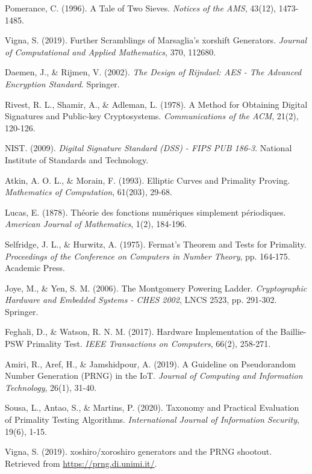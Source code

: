 \begin{thebibliography}{99}
 Pomerance, C. (1996). A Tale of Two Sieves. \textit{Notices of the AMS}, 43(12), 1473-1485.

 Vigna, S. (2019). Further Scramblings of Marsaglia's xorshift Generators. \textit{Journal of Computational and Applied Mathematics}, 370, 112680.

 Daemen, J., \& Rijmen, V. (2002). \textit{The Design of Rijndael: AES - The Advanced Encryption Standard}. Springer.

 Rivest, R. L., Shamir, A., \& Adleman, L. (1978). A Method for Obtaining Digital Signatures and Public-key Cryptosystems. \textit{Communications of the ACM}, 21(2), 120-126.

 NIST. (2009). \textit{Digital Signature Standard (DSS) - FIPS PUB 186-3}. National Institute of Standards and Technology.

 Atkin, A. O. L., \& Morain, F. (1993). Elliptic Curves and Primality Proving. \textit{Mathematics of Computation}, 61(203), 29-68.

 Lucas, E. (1878). Théorie des fonctions numériques simplement périodiques. \textit{American Journal of Mathematics}, 1(2), 184-196.

 Selfridge, J. L., \& Hurwitz, A. (1975). Fermat's Theorem and Tests for Primality. \textit{Proceedings of the Conference on Computers in Number Theory}, pp. 164-175. Academic Press.

 Joye, M., \& Yen, S. M. (2006). The Montgomery Powering Ladder. \textit{Cryptographic Hardware and Embedded Systems - CHES 2002}, LNCS 2523, pp. 291-302. Springer.

 Feghali, D., \& Watson, R. N. M. (2017). Hardware Implementation of the Baillie-PSW Primality Test. \textit{IEEE Transactions on Computers}, 66(2), 258-271.

 Amiri, R., Aref, H., \& Jamshidpour, A. (2019). A Guideline on Pseudorandom Number Generation (PRNG) in the IoT. \textit{Journal of Computing and Information Technology}, 26(1), 31-40.

 Sousa, L., Antao, S., \& Martins, P. (2020). Taxonomy and Practical Evaluation of Primality Testing Algorithms. \textit{International Journal of Information Security}, 19(6), 1-15.

 Vigna, S. (2019). xoshiro/xoroshiro generators and the PRNG shootout. Retrieved from \url{https://prng.di.unimi.it/}.


\end{thebibliography}

